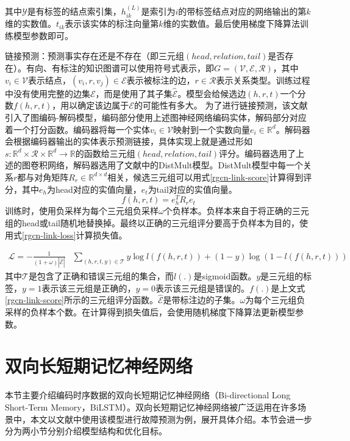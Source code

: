 其中$\mathcal{Y}$是有标签的结点索引集，$h_{i k}^{(L)}$是索引为$i$的带标签结点对应的网络输出的第$k$维的实数值。$t_{i k}$表示该实体的标注向量第$k$维的实数值。最后使用梯度下降算法训练模型参数即可。

链接预测：预测事实存在还是不存在（即三元组$(head,relation,tail)$是否存在）。有向、有标注的知识图谱可以使用符号式表示，即$G=(\mathcal{V}, \mathcal{E}, \mathcal{R})$，其中$v_i\in\mathcal{V}$表示结点，$\left(v_i,r,v_j\right)\in\mathcal{E}$表示被标注的边，$r\in\mathcal{R}$表示关系类型。训练过程中没有使用完整的边集$\mathcal{E}$，而是使用了其子集$\hat{\mathcal{E}}$。模型会给候选边$(h, r, t)$一个分数$f(h, r, t)$，用以确定该边属于$\mathcal{E}$的可能性有多大。
为了进行链接预测，该文献引入了图编码-解码模型，编码部分使用上述图神经网络编码实体，解码部分对应着一个打分函数。编码器将每一个实体$v_{i} \in \mathcal{V}$映射到一个实数向量$e_{i} \in \mathbb{R}^{d}$。解码器会根据编码器输出的实体表示预测链接，具体实现上就是通过形如$s: \mathbb{R}^{d} \times \mathcal{R} \times \mathbb{R}^{d} \rightarrow \mathbb{R}$的函数给三元组$(head, relation, tail)$评分。编码器选用了上述的图卷积网络，解码器选用了文献\parencite{yang2014embedding}中的DistMult模型。DistMult模型中每一个关系$r$都与对角矩阵$R_{r} \in \mathbb{R}^{d \times d}$相关，候选三元组可以用式\ref{rgcn-link-score}计算得到评分，其中$e_{h}$为head对应的实值向量，$e_{t}$为tail对应的实值向量。
\begin{equation}
    f(h, r, t)=e_{h}^{T} R_{r} e_{t}
    \label{rgcn-link-score}
\end{equation}
训练时，使用负采样为每个三元组负采样$\omega$个负样本。负样本来自于将正确的三元组的head或tail随机地替换掉。最终以正确的三元组评分要高于负样本为目的，使用式\ref{rgcn-link-loss}计算损失值。

\begin{equation}
    \begin{aligned}
        \mathcal{L}=-\frac{1}{(1+\omega)|\hat{\mathcal{E}}|} & \sum_{(h, r, t, y) \in \mathcal{T}} y \log l(f(h, r, t)) + (1-y) \log (1-l(f(h, r, t)))
        \end{aligned}
    \label{rgcn-link-loss}
\end{equation}
其中$\mathcal{T}$是包含了正确和错误三元组的集合，而$l(.)$是sigmoid函数。$y$是三元组的标签，$y=1$表示该三元组是正确的，$y=0$表示该三元组是错误的。$f(.)$是上文式\ref{rgcn-link-score}所示的三元组评分函数。$\hat{\mathcal{E}}$是带标注边的子集。$\omega$为每个三元组负采样的负样本个数。在计算得到损失值后，会使用随机梯度下降算法更新模型参数。

\section{双向长短期记忆神经网络}\label{memory-net-section}
本节主要介绍编码时序数据的双向长短期记忆神经网络（Bi-directional Long Short-Term Memory，BiLSTM）。双向长短期记忆神经网络被广泛运用在许多场景中，本文以文献\parencite{gao2020task}中使用该模型进行故障预测为例，展开具体介绍。本节会进一步分为两小节分别介绍模型结构和优化目标。
